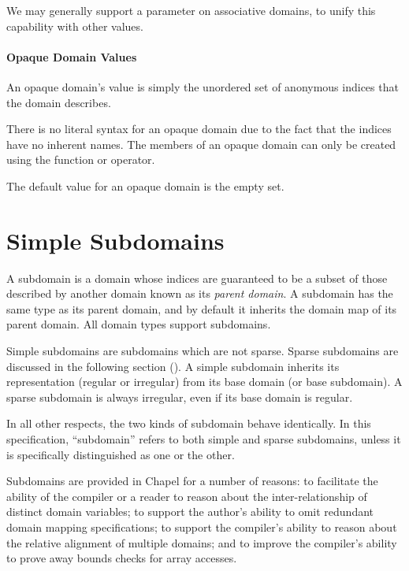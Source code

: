 \begin{future}
We may generally support a  parameter on associative
domains, to unify this capability with other values.
\end{future}

\paragraph{Opaque Domain Values}

An opaque domain's value is simply the unordered set of anonymous
indices that the domain describes.


There is no literal syntax for an opaque domain due to the fact that
the indices have no inherent names.  The members of an opaque domain can only be
created using the  function or \chpl{+} operator.


The default value for an opaque domain is the empty set.


\section{Simple Subdomains}
\label{Simple_Subdomains}

A subdomain is a domain whose indices are guaranteed to be a subset of
those described by another domain known as its \emph{parent domain}.
A subdomain has the same type as its parent domain, and by default
it inherits the domain map of its parent domain.  All domain types
support subdomains.

Simple subdomains are subdomains which are not sparse.  Sparse subdomains are
discussed in the following section ().  A simple
subdomain inherits its representation (regular or irregular) from its base domain (or base
subdomain).  A sparse subdomain is always irregular, even if its base domain is
regular.  

In all other respects, the two kinds of subdomain behave identically.  In this
specification, ``subdomain'' refers to both simple and sparse subdomains, unless
it is specifically distinguished as one or the other.

\begin{rationale}
Subdomains are provided in Chapel for a number of reasons: to
facilitate the ability of the compiler or a reader to reason about the
inter-relationship of distinct domain variables; to support the
author's ability to omit redundant domain mapping specifications; to
support the compiler's ability to reason about the relative alignment
of multiple domains; and to improve the compiler's ability to prove
away bounds checks for array accesses.
\end{rationale}

